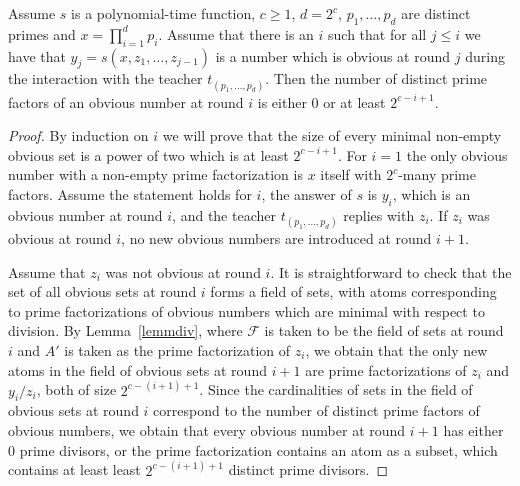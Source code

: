 \documentclass{lmcs}
\newcommand{\F}{\mathcal{F}}
\begin{document}
\begin{lem}\label{lemmaobvsize}
    Assume $s$ is a polynomial-time function, $c\geq 1$, $d=2^c$, $p_1,\dots,p_d$ are distinct primes and $x=\prod_{i=1}^d p_i$.  Assume that there is an $i$ such that for all $j\leq i$ we have that $y_j=s(x,z_1,\dots,z_{j-1})$ is a number which is obvious at round $j$ during the interaction with the teacher $t_{(p_1,\dots,p_d)}$. Then the number of distinct prime factors of an obvious number at round $i$ is either $0$ or at least $2^{c-i+1}$.
\end{lem}
\begin{proof}
    By induction on $i$ we will prove that the size of every minimal non-empty obvious set is a power of two which is at least $2^{c-i+1}$. For $i=1$ the only obvious number with a non-empty prime factorization is $x$ itself with $2^{c}$-many prime factors. Assume the statement holds for $i$, the answer of $s$ is $y_i$, which is an obvious number at round $i$, and the teacher $t_{(p_1,\dots,p_d)}$ replies with $z_i$. If $z_i$ was obvious at round $i$, no new obvious numbers are introduced at round $i+1$. 
    
    Assume that $z_i$ was not obvious at round $i$. It is straightforward to check that the set of all obvious sets at round $i$ forms a field of sets, with atoms corresponding to prime factorizations of obvious numbers which are minimal with respect to division. By Lemma~\ref{lemmdiv}, where $\F$ is taken to be the field of sets at round $i$ and $A'$ is taken as the prime factorization of $z_i$, we obtain that the only new atoms in the field of obvious sets at round $i+1$ are prime factorizations of $z_i$ and $y_i/z_i$, both of size $2^{c-(i+1)+1}$. Since the cardinalities of sets in the field of obvious sets at round $i$ correspond to the number of distinct prime factors of obvious numbers, we obtain that every obvious number at round $i+1$ has either $0$ prime divisors, or the prime factorization contains an atom as a subset, which contains at least least $2^{c-(i+1)+1}$ distinct prime divisors.
\end{proof}
\end{document}
